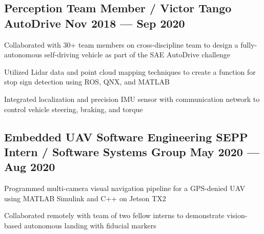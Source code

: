 \subsection{{Perception Team Member / Victor Tango AutoDrive \hfill Nov 2018 --- Sep 2020}}
\begin{zitemize}
	\item Collaborated with 30+ team members on cross-discipline team to design a fully-autonomous self-driving
    vehicle as part of the SAE AutoDrive challenge
	\item Utilized Lidar data and point cloud mapping techniques to create a function for stop sign detection using ROS, QNX, and MATLAB
	\item Integrated localization and precision IMU sensor with communication network to control vehicle steering, braking,
    and torque
\end{zitemize}

\subsection{{Embedded UAV Software Engineering SEPP Intern / Software Systems Group  \hfill May 2020 --- Aug 2020}}
\begin{zitemize}
	\item Programmed multi-camera visual navigation pipeline for a GPS-denied UAV using MATLAB Simulink and C++ on Jetson
    TX2
	\item Collaborated remotely with team of two fellow interns to demonstrate vision-based autonomous landing with fiducial
	markers
\end{zitemize}



